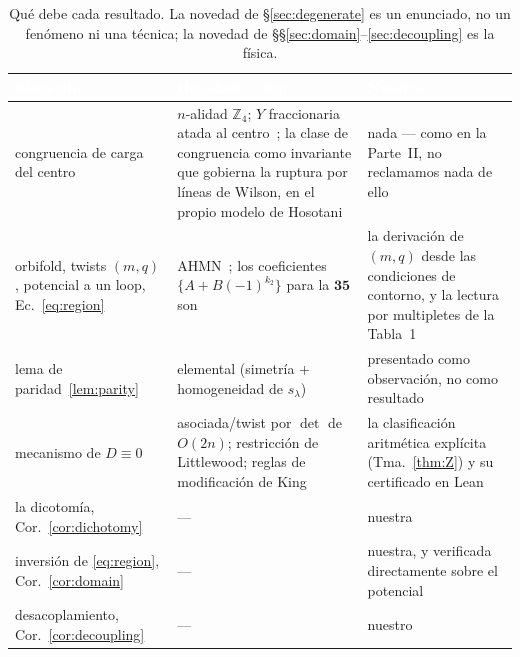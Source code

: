 \documentclass[11pt,a4paper]{article}
\newcommand{\ZZ}{\mathbb{Z}}
\begin{document}
\begin{table}[h]
\centering\small
\begin{tabular}{p{4.0cm}p{5.0cm}p{5.2cm}}
\toprule
\rowcolor{hdrblue}
\textcolor{white}{Elemento} & \textcolor{white}{Heredado (citar)} & \textcolor{white}{Nuestro}\\
\midrule
congruencia de carga del centro &
$n$-alidad $\ZZ_4$; $Y$ fraccionaria atada al centro~\cite{Hucks,Saller,Tong,Alonso,Slansky};
la clase de congruencia como invariante que gobierna la ruptura por líneas de Wilson, en el
propio modelo de Hosotani~\cite{DaviesMcLachlan1,DaviesMcLachlan2} &
nada --- como en la Parte~II, no reclamamos nada de ello\\
\midrule
\rowcolor{softgrey}
orbifold, twists $(m,q)$, potencial a un loop, Ec.~\eqref{eq:region} &
AHMN~\cite{AHMN,AHMN23}; los coeficientes $\{A+B(-1)^{k_2}\}$ para la $\mathbf{35}$ son
\cite[Ec.~(3.25)]{AHMN23} &
la derivación de $(m,q)$ desde las condiciones de contorno, y la lectura por multipletes de la Tabla~1\\
\midrule
lema de paridad~\ref{lem:parity} &
elemental (simetría + homogeneidad de $s_\lambda$) & presentado como observación, no como resultado\\
\midrule
\rowcolor{softgrey}
mecanismo de $D\equiv0$ &
asociada/twist por $\det$ de $O(2n)$; restricción de Littlewood; reglas de modificación de King~\cite{King71,Newell,Brauer,AyyerBehrend} &
la clasificación aritmética explícita (Tma.~\ref{thm:Z}) y su certificado en Lean\\
\midrule
la dicotomía, Cor.~\ref{cor:dichotomy} & --- & nuestra\\
\midrule
\rowcolor{softgrey}
inversión de \eqref{eq:region}, Cor.~\ref{cor:domain} & --- & nuestra, y verificada directamente sobre el potencial\\
\midrule
desacoplamiento, Cor.~\ref{cor:decoupling} & --- & nuestro\\
\bottomrule
\end{tabular}
\caption{Qué debe cada resultado. La novedad de \S\ref{sec:degenerate} es un enunciado, no un
fenómeno ni una técnica; la novedad de \S\S\ref{sec:domain}--\ref{sec:decoupling} es la
física.}
\label{tab:ledger}
\end{table}
\end{document}
